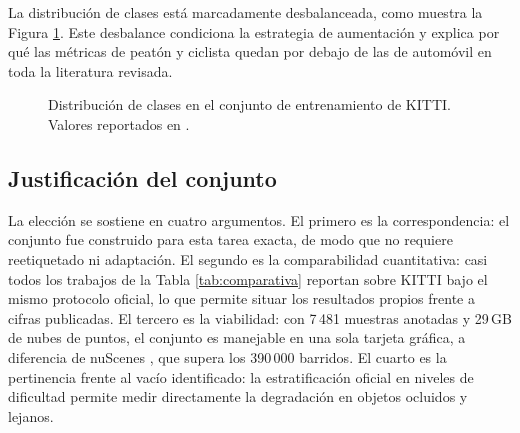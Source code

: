 \documentclass[11pt,letterpaper]{article}
\begin{document}
La distribución de clases está marcadamente desbalanceada, como muestra la Figura \ref{fig:clases}. Este desbalance condiciona la estrategia de aumentación y explica por qué las métricas de peatón y ciclista quedan por debajo de las de automóvil en toda la literatura revisada.

\begin{figure}[htbp]
\centering
{}
\caption{Distribución de clases en el conjunto de entrenamiento de KITTI. Valores reportados en \cite{wirges2018}.}
\label{fig:clases}
\end{figure}

\subsection{Justificación del conjunto}

La elección se sostiene en cuatro argumentos. El primero es la correspondencia: el conjunto fue construido para esta tarea exacta, de modo que no requiere reetiquetado ni adaptación. El segundo es la comparabilidad cuantitativa: casi todos los trabajos de la Tabla \ref{tab:comparativa} reportan sobre KITTI bajo el mismo protocolo oficial, lo que permite situar los resultados propios frente a cifras publicadas. El tercero es la viabilidad: con 7\,481 muestras anotadas y 29\,GB de nubes de puntos, el conjunto es manejable en una sola tarjeta gráfica, a diferencia de nuScenes \cite{caesar2020}, que supera los 390\,000 barridos. El cuarto es la pertinencia frente al vacío identificado: la estratificación oficial en niveles de dificultad permite medir directamente la degradación en objetos ocluidos y lejanos.
\end{document}
